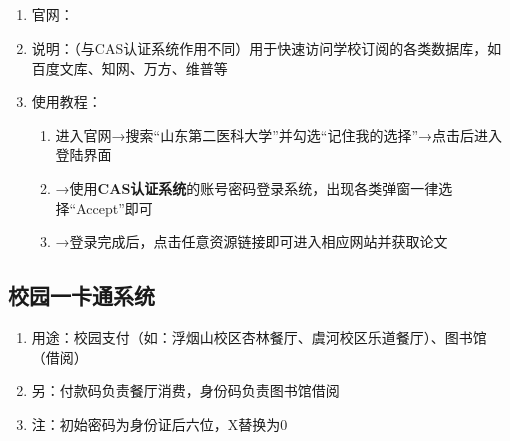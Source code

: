 \subsection[CARSI系统]{\textbf{}}
\label{carsi_system}
\begin{enumerate}
    \item 官网：
    \item 说明：（与CAS认证系统作用不同）用于快速访问学校订阅的各类数据库，如百度文库、知网、万方、维普等
    \item 使用教程：
          \begin{enumerate}
              \item 进入官网→搜索“山东第二医科大学”并勾选“记住我的选择”→点击后进入登陆界面\footnotemark
              \item →使用\textbf{CAS认证系统}的账号密码登录系统，出现各类弹窗一律选择“Accept”即可\footnotemark
              \item →登录完成后，点击任意资源链接即可进入相应网站并获取论文
          \end{enumerate}
\end{enumerate}

\subsection[校园一卡通系统]{校园一卡通系统}
\label{union_card}
\begin{enumerate}
    \item 用途：校园支付（如：浮烟山校区杏林餐厅、虞河校区乐道餐厅）\footnotemark、图书馆（借阅）
    \item 另：付款码负责餐厅消费，身份码负责图书馆借阅
    \item 注：初始密码为身份证后六位，X替换为0
\end{enumerate}

